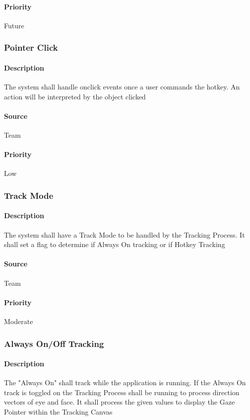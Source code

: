 \paragraph{Priority}
Future
\subsubsection{Pointer Click}
\paragraph{Description}
The system shall handle onclick events once a user commands the hotkey.  An action will be interpreted by the object clicked
\paragraph{Source}
Team
\paragraph{Priority}
Low
\subsubsection{Track Mode}
\paragraph{Description}
The system shall have a Track Mode to be handled by the Tracking Process.  It shall set a flag to determine if Always On tracking or if Hotkey Tracking
\paragraph{Source}
Team
\paragraph{Priority}
Moderate
\subsubsection{Always On/Off Tracking}
\paragraph{Description}
The "Always On" shall track while the application is running.  If the Always On track is toggled on the Tracking Process shall be running to process direction vectors of eye and face. It shall process the given values to display the Gaze Pointer within the Tracking Canvas
